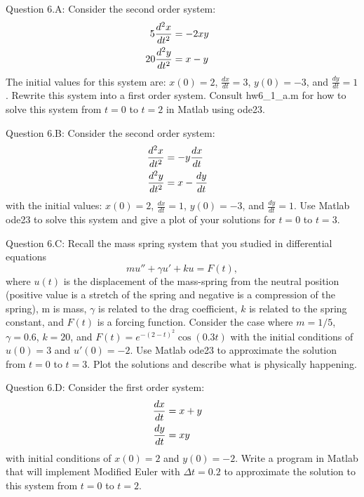 \documentclass{article}
\def\ds{\displaystyle}
\begin{document}
%
Question 6.A: Consider the second order system:
\begin{align*}
    5\frac {d^2x}{dt^2} &= -2xy  \cr 
    20 \frac {d^2y}{dt^2} &= x-y
\end{align*}
The initial values for this system are: $x(0)=2$, $\ds \frac {dx}{dt}=3$, $y(0)= -3$, and $\ds \frac {dy}{dt}=1$. Rewrite this system into a first order system. Consult hw6\_1\_a.m for how to solve this system from $t=0$ to $t=2$ in Matlab using ode23. 
\par \medskip \noindent 
%
Question 6.B: Consider the second order system:
\begin{align*}
    \frac {d^2x}{dt^2} &= -y\frac {dx}{dt}  \cr 
    \frac {d^2y}{dt^2} &= x-\frac {dy}{dt}
\end{align*}
with the initial values: $x(0)=2$, $\ds \frac {dx}{dt}=1$, $y(0)= -3$, and $\ds \frac {dy}{dt}=1$. Use Matlab ode23 to solve this system and give a plot of your solutions for $t=0$ to $t=3$. 
\par \medskip \noindent 
%
Question 6.C: Recall the mass spring system that you studied in differential equations
$$mu''+\gamma u' + ku = F(t),$$
where $u(t)$ is the displacement of the mass-spring from the neutral position (positive value is a stretch of the spring and negative is a compression of the spring), m is mass, $\gamma$ is related to the drag coefficient, $k$ is related to the spring constant, and $F(t)$ is a forcing function. Consider the case where $m=1/5$, $\gamma = 0.6$, $k=20$, and $\ds F(t) = e^{-(2-t)^2} \cos(0.3t)$ with the initial conditions of $u(0)=3$ and $u'(0)= -2$. Use Matlab ode23 to approximate the solution from $t=0$ to $t=3$. Plot the solutions and describe what is physically happening. 
\par \medskip \noindent 
%
Question 6.D: Consider the first order system:
\begin{align*}
    \frac {dx}{dt} &= x+y  \cr 
    \frac {dy}{dt} &= xy
\end{align*}
with initial conditions of $x(0)=2$ and $y(0)=-2$. Write a program in Matlab that will implement Modified Euler with $\Delta t = 0.2$ to approximate the solution to this system from $t=0$ to $t=2$. 
\end{document}
